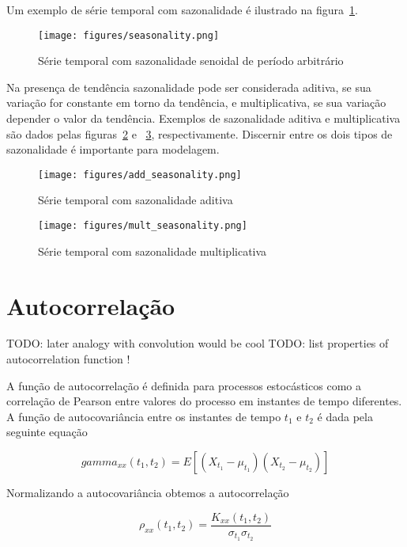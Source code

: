 Um exemplo de série temporal com sazonalidade é ilustrado na
figura~\ref{fig:seasonality}.

\begin{figure}[H]
    \centering
    \texttt{[image: figures/seasonality.png]}
    \caption{Série temporal com sazonalidade senoidal de período arbitrário}
    \label{fig:seasonality}
\end{figure}

Na presença de tendência sazonalidade pode ser considerada aditiva, se sua
variação for constante em torno da tendência, e multiplicativa, se sua variação
depender o valor da tendência. Exemplos de sazonalidade aditiva e
multiplicativa são dados pelas figuras~\ref{fig:add_seasonality} e
~\ref{fig:mult_seasonality}, respectivamente. Discernir entre os dois tipos de
sazonalidade é importante para modelagem.

\begin{figure}[H]
    \centering
    \texttt{[image: figures/add\_seasonality.png]}
    \caption{Série temporal com sazonalidade aditiva}
    \label{fig:add_seasonality}
\end{figure}

\begin{figure}[H]
    \centering
    \texttt{[image: figures/mult\_seasonality.png]}
    \caption{Série temporal com sazonalidade multiplicativa}
    \label{fig:mult_seasonality}
\end{figure}


\section{Autocorrelação}

TODO: later analogy with convolution would be cool
TODO: list properties of autocorrelation function !

A função de autocorrelação é definida para processos estocásticos como a
correlação de Pearson entre valores do processo em instantes de tempo
diferentes. A função de autocovariância entre os instantes de tempo $t_1$ e
$t_2$ é dada pela seguinte equação

\begin{equation}\label{eq:raw_autocorr}
    gamma_{xx}(t_1, t_2) = E[(X_{t_1} - \mu_{t_1})(X_{t_2} -\mu_{t_2})]
\end{equation}

Normalizando a autocovariância obtemos a autocorrelação

$$\rho_{xx}(t_1, t_2) =\frac{K_{xx}(t_1, t_2)}{\sigma_{t_1}\sigma_{t_2}}$$

